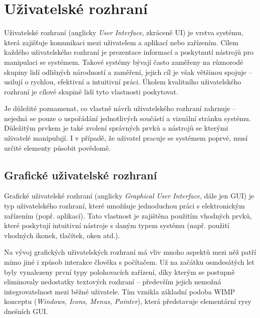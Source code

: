 \chapter{Uživatelské rozhraní}
\label{chap:ui}

Uživatelské rozhraní (anglicky \textit{User Interface}, zkráceně UI) je vrstva systému, která zajišťuje komunikaci mezi uživatelem a aplikací nebo zařízením. Cílem každého uživatelského rozhraní je prezentace informací a poskytnutí nástrojů pro manipulaci se systémem. Takové systémy bývají často zaměřeny na různorodé skupiny lidí odlišných národností a zaměření, jejich cíl je však většinou spojuje -- usilují o rychlou, efektivní a intuitivní práci. Úkolem kvalitního uživatelského rozhraní je cílové skupině lidí tyto vlastnosti poskytovat. \cite{2}

Je důležité poznamenat, co vlastně návrh uživatelského rozhraní zahrnuje -- nejedná se pouze o uspořádání jednotlivých součástí a vizuální stránku systému. Důležitým prvkem je také zvolení správných prvků a nástrojů se kterými uživatelé manipulují. I v případě, že uživatel pracuje se systémem poprvé, musí určité elementy působit povědomě.

\section{Grafické uživatelské rozhraní}
\label{sec:gui}

Grafické uživatelské rozhraní (anglicky \textit{Graphical User Interface}, dále jen GUI) je typ uživatelského rozhraní, které umožňuje jednoduchou práci s elektronickým zařízením (popř. aplikací). Tato vlastnost je zajištěna použitím vhodných prvků, které poskytují intuitivní nástroje s daným typem systému (např. použití vhodných ikonek, tlačítek, oken atd.).

Na vývoj grafických uživatelských rozhraní má vliv mnoho aspektů mezi něž patří mimo jiné i způsob interakce člověka s počítačem. Už na začátku osmdesátých let byly vynalezeny první typy polohovacích zařízení, díky kterým se postupně eliminovaly nedostatky textových rozhraní -- především jejich nemožná integrovatelnost mezi běžné uživatele. Tím vznikla základní podoba WIMP konceptu (\textit{Windows, Icons, Menus, Pointer}), která představuje elementární rysy dnešních GUI.

